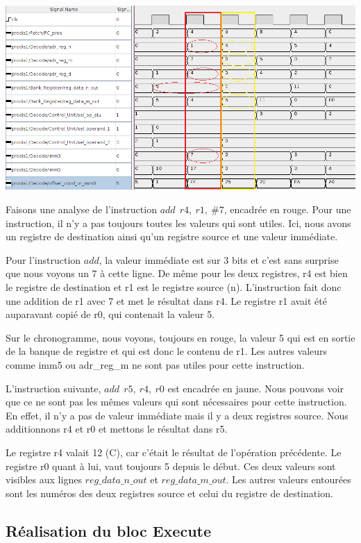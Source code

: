 \documentclass[11pt,a4paper]{article}
\begin{document}
\includegraphics[width=15.8cm]{img_Chronogram.png}

Faisons une analyse de l'instruction $add\ \ r4,\ r1,\ \#7$, encadrée en rouge. Pour une instruction, il n'y a pas toujours toutes les valeurs qui sont utiles. Ici, nous avons un registre de destination ainsi qu'un registre source et une valeur immédiate.

Pour l'instruction $add$, la valeur immédiate est sur 3 bits et c'est sans surprise que nous voyons un 7 à cette ligne. De même pour les deux registres, r4 est bien le registre de destination et r1 est le registre source (n). L'instruction fait donc une addition de r1 avec 7 et met le résultat dans r4. Le registre r1 avait été auparavant copié de r0, qui contenait la valeur 5.

Sur le chronogramme, nous voyons, toujours en rouge, la valeur 5 qui est en sortie de la banque de registre et qui est donc le contenu de r1. Les autres valeurs comme imm5 ou adr\_reg\_m ne sont pas utiles pour cette instruction.

L'instruction suivante, $add\ \ r5,\ r4,\ r0$ est encadrée en jaune. Nous pouvons voir que ce ne sont pas les mêmes valeurs qui sont nécessaires pour cette instruction. En effet, il n'y a pas de valeur immédiate mais il y a deux registres source. Nous additionnons r4 et r0 et mettons le résultat dans r5. 

Le registre r4 valait 12 (C), car c'était le résultat de l'opération précédente. Le registre r0 quant à lui, vaut toujours 5 depuis le début. Ces deux valeurs sont visibles aux lignes $reg\_data\_n\_out$ et $reg\_data\_m\_out$. Les autres valeurs entourées sont les numéros des deux registres source et celui du registre de destination.

\newpage
\subsection{Réalisation du bloc Execute}
\end{document}
